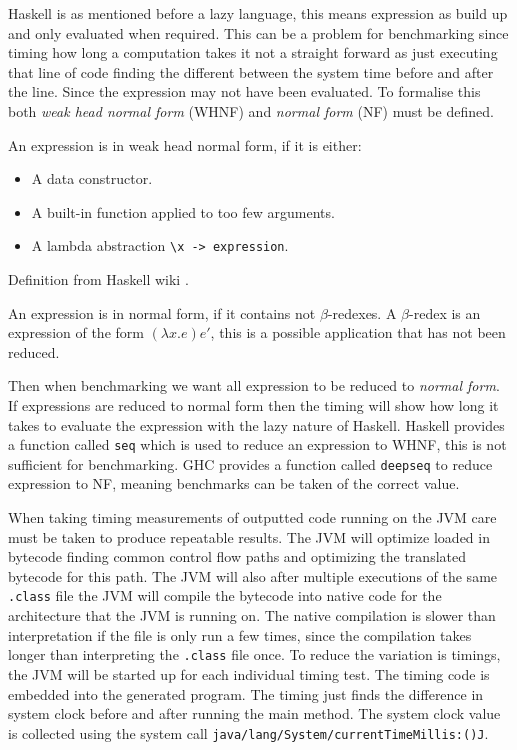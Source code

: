 \documentclass[float=false, crop=false]{standalone}
\begin{document}
Haskell is as mentioned before a lazy language, this means expression as build up and only
evaluated when required. This can be a problem for benchmarking since timing how long a
computation takes it not a straight forward as just executing that line
of code finding the different between the system time before and after the line. Since 
the expression may not have been evaluated. 
To formalise this both \textit{weak head normal form} (WHNF) and \textit{normal form} (NF) must be 
defined.
\begin{displayquote}
  An expression is in weak head normal form, if it is either:
  \begin{itemize}
    \item A data constructor.

    \item A built-in function applied to too few arguments.

    \item A lambda abstraction \verb|\x -> expression|.
  \end{itemize}
\end{displayquote}
Definition from Haskell wiki \cite{haskell-whnf}.
\begin{displayquote}
  An expression is in normal form, if it contains not $\beta$-redexes. A $\beta$-redex is an
  expression of the form $(\lambda x.e)e'$, this is a possible application that has not been reduced.
\end{displayquote}
Then when benchmarking we want all expression to be reduced to \textit{normal form}. If expressions
are reduced to normal form then the timing will show how long it takes to evaluate the expression
with the lazy nature of Haskell. Haskell provides a function called \verb|seq| which is used to 
reduce an expression to WHNF, this is not sufficient for benchmarking. GHC provides a function
called \verb|deepseq| to reduce expression to NF, meaning benchmarks can be taken of the 
correct value.

When taking timing measurements of outputted code running on the JVM care
must be taken to produce repeatable results. The JVM will optimize loaded
in bytecode finding common control flow paths and optimizing the translated
bytecode for this path. The JVM will also after multiple executions
of the same \verb|.class| file the JVM will compile the bytecode
into native code for the architecture that the JVM is running on. 
The native compilation is slower than interpretation if the file
is only run a few times, since the compilation takes longer than
interpreting the \verb|.class| file once.
To reduce the variation is timings, the JVM will be started up for 
each individual timing test. The timing code is embedded into the
generated program. The timing just finds the difference in 
system clock before and after running the main method. The 
system clock value is collected using the system call
\verb|java/lang/System/currentTimeMillis:()J|.
\end{document}

